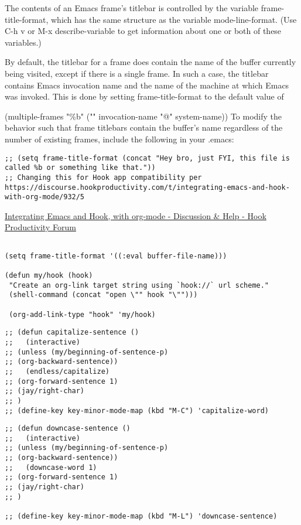 \documentclass[11pt]{article}
\begin{document}
The contents of an Emacs frame's titlebar is controlled by the variable frame-title-format, which has the same structure as the variable mode-line-format. (Use C-h v or M-x describe-variable to get information about one or both of these variables.)

By default, the titlebar for a frame does contain the name of the buffer currently being visited, except if there is a single frame. In such a case, the titlebar contains Emacs invocation name and the name of the machine at which Emacs was invoked. This is done by setting frame-title-format to the default value of

(multiple-frames "\%b" ("" invocation-name "@" system-name))
To modify the behavior such that frame titlebars contain the buffer's name regardless of the number of existing frames, include the following in your .emacs:


\begin{verbatim}
;; (setq frame-title-format (concat "Hey bro, just FYI, this file is called %b or something like that."))
;; Changing this for Hook app compatibility per https://discourse.hookproductivity.com/t/integrating-emacs-and-hook-with-org-mode/932/5 
\end{verbatim}

\label{sec:orgb0f7778}
\href{https://discourse.hookproductivity.com/t/integrating-emacs-and-hook-with-org-mode/932/10}{Integrating Emacs and Hook, with org-mode - Discussion \& Help - Hook Productivity Forum}

\begin{verbatim}

(setq frame-title-format '((:eval buffer-file-name))) 

(defun my/hook (hook)
 "Create an org-link target string using `hook://` url scheme."
 (shell-command (concat "open \"" hook "\"")))

 (org-add-link-type "hook" 'my/hook) 
\end{verbatim}
\label{sec:orgb1cf270}
\begin{verbatim}
;; (defun capitalize-sentence ()
;;   (interactive)
;; (unless (my/beginning-of-sentence-p)
;; (org-backward-sentence))
;;   (endless/capitalize)
;; (org-forward-sentence 1)
;; (jay/right-char)
;; )
;; (define-key key-minor-mode-map (kbd "M-C") 'capitalize-word)

\end{verbatim}
\label{sec:org513767b}
\begin{verbatim}
;; (defun downcase-sentence ()
;;   (interactive)
;; (unless (my/beginning-of-sentence-p)
;; (org-backward-sentence))
;;   (downcase-word 1)
;; (org-forward-sentence 1)
;; (jay/right-char)
;; )

;; (define-key key-minor-mode-map (kbd "M-L") 'downcase-sentence)

\end{verbatim}
\label{sec:org82c8918}
\end{document}
